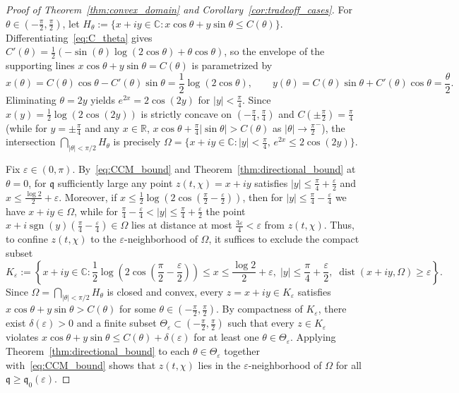 \documentclass[11pt,a4paper]{amsart}
\theoremstyle{remark}
\numberwithin{equation}{section}
\newcommand{\R}{\mathbb{R}}
\newcommand{\C}{\mathbb{C}}
\newcommand{\q}{\mathfrak{q}}
\DeclareMathOperator{\sgn}{sgn}
\begin{document}
\begin{proof}[Proof of Theorem~\ref{thm:convex_domain} and Corollary~\ref{cor:tradeoff_cases}]
For $\theta \in (-\frac{\pi}{2},\frac{\pi}{2})$, let $H_\theta := \{x+iy \in \C : x\cos\theta + y\sin\theta \le C(\theta)\}$. Differentiating~\eqref{eq:C_theta} gives $C'(\theta) = \frac{1}{2}(-\sin(\theta)\log(2\cos\theta) + \theta\cos\theta)$, so the envelope of the supporting lines $x\cos\theta + y\sin\theta = C(\theta)$ is parametrized by
\[
  x(\theta) = C(\theta)\cos\theta - C'(\theta)\sin\theta = \frac{1}{2}\log(2\cos\theta), \qquad
  y(\theta) = C(\theta)\sin\theta + C'(\theta)\cos\theta = \frac{\theta}{2}.
\]
Eliminating $\theta = 2y$ yields $e^{2x} = 2\cos(2y)$ for $|y| < \frac{\pi}{4}$. Since $x(y) = \frac{1}{2}\log(2\cos(2y))$ is strictly concave on $(-\frac{\pi}{4},\frac{\pi}{4})$ and $C(\pm\frac{\pi}{2}) = \frac{\pi}{4}$ (while for $y = \pm\frac{\pi}{4}$ and any $x \in \R$, $x\cos\theta + \frac{\pi}{4}|\sin\theta| > C(\theta)$ as $|\theta|\to\frac{\pi}{2}^-$), the intersection $\bigcap_{|\theta|<\pi/2} H_\theta$ is precisely $\Omega = \{x+iy \in \C : |y| < \frac{\pi}{4},\, e^{2x} \le 2\cos(2y)\}$.

Fix $\varepsilon \in (0,\pi)$. By~\eqref{eq:CCM_bound} and Theorem~\ref{thm:directional_bound} at $\theta = 0$, for $\q$ sufficiently large any point $z(t,\chi) = x+iy$ satisfies $|y| \le \frac{\pi}{4}+\frac{\varepsilon}{2}$ and $x \le \frac{\log 2}{2}+\varepsilon$. Moreover, if $x \le \frac{1}{2}\log(2\cos(\frac{\pi}{2}-\frac{\varepsilon}{2}))$, then for $|y| \le \frac{\pi}{4}-\frac{\varepsilon}{4}$ we have $x+iy \in \Omega$, while for $\frac{\pi}{4}-\frac{\varepsilon}{4} < |y| \le \frac{\pi}{4}+\frac{\varepsilon}{2}$ the point $x + i\sgn(y)(\frac{\pi}{4}-\frac{\varepsilon}{4}) \in \Omega$ lies at distance at most $\frac{3\varepsilon}{4} < \varepsilon$ from $z(t,\chi)$. Thus, to confine $z(t,\chi)$ to the $\varepsilon$-neighborhood of $\Omega$, it suffices to exclude the compact subset
\[
  K_\varepsilon := \left\{x+iy \in \C : \frac{1}{2}\log\!\left(2\cos\!\left(\frac{\pi}{2}-\frac{\varepsilon}{2}\right)\right) \le x \le \frac{\log 2}{2}+\varepsilon,\; |y| \le \frac{\pi}{4}+\frac{\varepsilon}{2},\; \operatorname{dist}(x+iy,\Omega) \ge \varepsilon\right\}.
\]
Since $\Omega = \bigcap_{|\theta|<\pi/2} H_\theta$ is closed and convex, every $z = x+iy \in K_\varepsilon$ satisfies $x\cos\theta + y\sin\theta > C(\theta)$ for some $\theta \in (-\frac{\pi}{2},\frac{\pi}{2})$. By compactness of $K_\varepsilon$, there exist $\delta(\varepsilon) > 0$ and a finite subset $\Theta_\varepsilon \subset (-\frac{\pi}{2},\frac{\pi}{2})$ such that every $z \in K_\varepsilon$ violates $x\cos\theta + y\sin\theta \le C(\theta)+\delta(\varepsilon)$ for at least one $\theta \in \Theta_\varepsilon$. Applying Theorem~\ref{thm:directional_bound} to each $\theta \in \Theta_\varepsilon$ together with~\eqref{eq:CCM_bound} shows that $z(t,\chi)$ lies in the $\varepsilon$-neighborhood of $\Omega$ for all $\q \ge \q_0(\varepsilon)$.


\end{proof}
\end{document}
